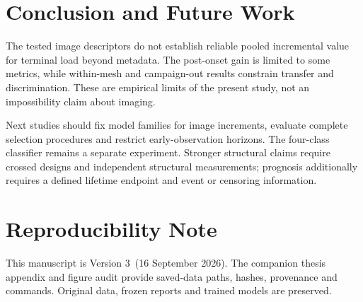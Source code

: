 \documentclass[conference]{IEEEtran}
\newcommand{\shared}{../..}
\newcommand{\draftversion}{Version 3}
\begin{document}
\section{Conclusion and Future Work}
The tested image descriptors do not establish reliable pooled incremental value for terminal load beyond metadata. The post-onset gain is limited to some metrics, while within-mesh and campaign-out results constrain transfer and discrimination. These are empirical limits of the present study, not an impossibility claim about imaging.

Next studies should fix model families for image increments, evaluate complete selection procedures and restrict early-observation horizons. The four-class classifier remains a separate experiment. Stronger structural claims require crossed designs and independent structural measurements; prognosis additionally requires a defined lifetime endpoint and event or censoring information.

\section*{Reproducibility Note}
This manuscript is \draftversion\ (16 September 2026). The companion thesis appendix and figure audit provide saved-data paths, hashes, provenance and commands. Original data, frozen reports and trained models are preserved.



\end{document}
